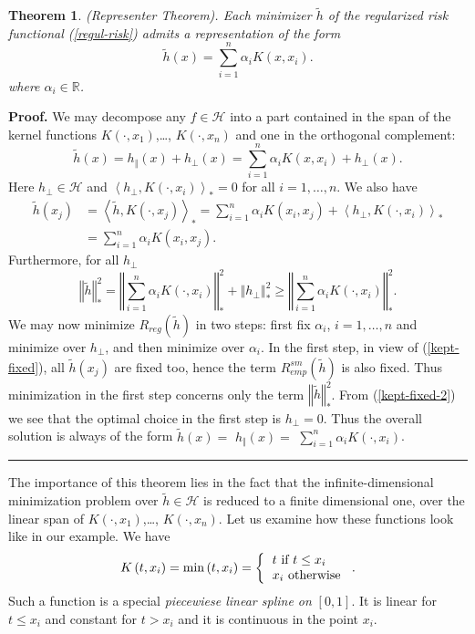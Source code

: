 \documentclass[11pt,twoside]{article}%
\theoremstyle{change}
\newtheorem{theorem}{Theorem}[section]
\newenvironment{proof}[1][Proof]{\textbf{#1.} }{\ \rule{0.5em}{0.5em}}
\begin{document}
\begin{theorem}
\label{theor-representer}(Representer Theorem). Each minimizer $\tilde{h}$ of
the regularized risk functional (\ref{regul-risk}) admits a representation of
the form
\[
\tilde{h}(x)=\sum_{i=1}^{n}\alpha_{i}K\left(  x,x_{i}\right)  .
\]
where $\alpha_{i}\in\mathbb{R}$.
\end{theorem}

\begin{proof}
We may decompose any $f\in\mathcal{H}$ into a part contained in the span of
the kernel functions $K\left(  \cdot,x_{1}\right)  $,\ldots, $K\left(
\cdot,x_{n}\right)  $ and one in the orthogonal complement:
\[
\tilde{h}(x)=h_{\Vert}(x)+h_{\bot}(x)=\sum_{i=1}^{n}\alpha_{i}K\left(
x,x_{i}\right)  +h_{\bot}(x).
\]
Here $h_{\bot}\in\mathcal{H}$ and $\left\langle h_{\bot},K\left(  \cdot
,x_{i}\right)  \right\rangle _{\ast}=0$ for all $i=1,\ldots,n$. We also have
\begin{align}
\tilde{h}(x_{j})  & =\left\langle \tilde{h},K\left(  \cdot,x_{j}\right)
\right\rangle _{\ast}=\sum_{i=1}^{n}\alpha_{i}K\left(  x_{i},x_{j}\right)
+\left\langle h_{\bot},K\left(  \cdot,x_{i}\right)  \right\rangle _{\ast}\\
& =\sum_{i=1}^{n}\alpha_{i}K\left(  x_{i},x_{j}\right)  .\label{kept-fixed}%
\end{align}
Furthermore, for all $h_{\bot}$
\begin{equation}
\left\Vert \tilde{h}\right\Vert _{\ast}^{2}=\left\Vert \sum_{i=1}^{n}%
\alpha_{i}K\left(  \cdot,x_{i}\right)  \right\Vert _{\ast}^{2}+\left\Vert
h_{\bot}\right\Vert _{\ast}^{2}\geq\left\Vert \sum_{i=1}^{n}\alpha_{i}K\left(
\cdot,x_{i}\right)  \right\Vert _{\ast}^{2}.\label{kept-fixed-2}%
\end{equation}
We may now minimize $R_{reg}(\tilde{h})$ in two steps: first fix $\alpha_{i}
$, $i=1,\ldots,n$ and minimize over $h_{\bot}$, and then minimize over
$\alpha_{i}$. In the first step, in view of (\ref{kept-fixed}), all $\tilde
{h}(x_{j})$ are fixed too, hence the term $R_{emp}^{sm}(\tilde{h})$ is also
fixed. Thus minimization in the first step concerns only the term $\left\Vert
\tilde{h}\right\Vert _{\ast}^{2}$. From (\ref{kept-fixed-2}) we see that the
optimal choice in the first step is $h_{\bot}=0$. Thus the overall solution is
always of the form $\tilde{h}(x)=$ $h_{\Vert}(x)=$ $\sum_{i=1}^{n}\alpha
_{i}K\left(  \cdot,x_{i}\right)  $.
\end{proof}

The importance of this theorem lies in the fact that the infinite-dimensional
minimization problem over $\tilde{h}\in\mathcal{H}$ is reduced to a finite
dimensional one, over the linear span of $K\left(  \cdot,x_{1}\right)
$,\ldots, $K\left(  \cdot,x_{n}\right)  $. Let us examine how these functions
look like in our example. We have
\[
K\left(  t,x_{i}\right)  =\min\left(  t,x_{i}\right)  =\left\{
\begin{tabular}
[c]{l}%
$t$ if $t\leq x_{i}$\\
$x_{i}$ otherwise
\end{tabular}
\right.  .
\]
Such a function is a special \textit{piecewiese linear spline on }$[0,1]$. It
is linear for $t\leq x_{i}$ and constant for $t>x_{i}$ and it is continuous in
the point $x_{i}$.
\end{document}
